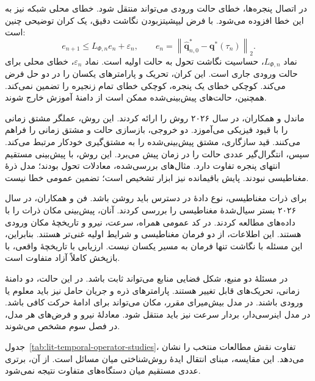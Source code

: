 در اتصال پنجره‌ها، خطای حالت ورودی می‌تواند منتقل شود.
خطای محلی شبکه نیز به این خطا افزوده می‌شود.
با فرض لیپشیتزبودن نگاشت دقیق، یک کران توضیحی چنین است:
\begin{equation}
e_{n+1}\leq L_{\Phi,n}e_n+\varepsilon_n,
\qquad
e_n=\left\|\widehat{\mathbf{q}}^{*}_{n,0}
-\mathbf{q}^{*}(\tau_n)\right\|_2.
\label{eq:lit-temporal-error-propagation}
\end{equation}
نماد $L_{\Phi,n}$، حساسیت نگاشت تحول به حالت اولیه است.
نماد $\varepsilon_n$، خطای محلی برای حالت ورودی جاری است.
این کران، تحریک و پارامترهای یکسان را در دو حل فرض می‌کند.
کوچکی خطای یک پنجره، کوچکی خطای تمام زنجیره را تضمین نمی‌کند.
همچنین، حالت‌های پیش‌بینی‌شده ممکن است از دامنهٔ آموزش خارج شوند.

ماندل و همکاران، در سال ۲۰۲۶ روش  را ارائه کردند.
این روش، عملگر مشتق زمانی را با قیود فیزیکی می‌آموزد.
دو خروجی، بازسازی حالت و مشتق زمانی را فراهم می‌کنند.
قید سازگاری، مشتق پیش‌بینی‌شده را به مشتق‌گیری خودکار مرتبط می‌کند.
سپس، انتگرال‌گیر عددی حالت را در زمان پیش می‌برد.
این روش، با پیش‌بینی مستقیم انتهای پنجره تفاوت دارد.
مثال‌های بررسی‌شده، معادلات تحول بودند؛ مدل ذرهٔ مغناطیسی نبودند.
پایش باقیمانده نیز ابزار تشخیص است؛ تضمین عمومی خطا نیست.
\cite{Mandl2026PITI}

برای ذرات مغناطیسی، نوع دادهٔ در دسترس باید روشن باشد.
فن و همکاران، در سال ۲۰۲۶ بستر سیال‌شدهٔ مغناطیسی را بررسی کردند.
آنان، پیش‌بینی مکان ذرات را با داده‌های  مطالعه کردند.
در کد عمومی همراه، سرعت، نیرو و تاریخچهٔ مکان ورودی هستند.
این اطلاعات، از دو فرمان مغناطیسی و شرایط اولیه غنی‌تر هستند.
بنابراین، این مسئله با نگاشت تنها فرمان به مسیر یکسان نیست.
ارزیابی با تاریخچهٔ واقعی، با بازپخش کاملاً آزاد متفاوت است.
\cite{Fan2026MagneticBed}

در مسئلهٔ دو منبع، شکل فضایی منابع می‌تواند ثابت باشد.
در این حالت، دو دامنهٔ زمانی، تحریک‌های قابل تغییر هستند.
پارامترهای ذره و جریان حامل نیز باید معلوم یا ورودی باشند.
در مدل بیش‌میرای مقرر، مکان می‌تواند برای ادامهٔ حرکت کافی باشد.
در مدل اینرسی‌دار، بردار سرعت نیز باید منتقل شود.
معادلهٔ نیرو و فرض‌های هر مدل، در فصل سوم مشخص می‌شوند.

جدول~\ref{tab:lit-temporal-operator-studies}، تفاوت نقش مطالعات منتخب را نشان می‌دهد.
این مقایسه، مبنای انتقال ایدهٔ روش‌شناختی میان مسائل است.
از آن، برتری عددی مستقیم میان دستگاه‌های متفاوت نتیجه نمی‌شود.

